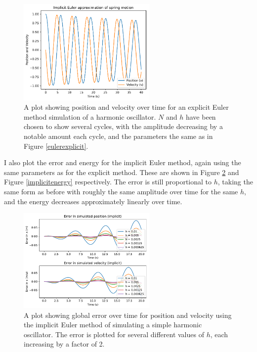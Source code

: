 \documentclass{article}
\begin{document}
\begin{figure}[H]
	\centering
	\includegraphics[width=0.6\textwidth]{eulerimplicit.pdf}
	\caption{A plot showing position and velocity over time for an explicit Euler method simulation of a harmonic oscillator. $N$ and $h$ have been chosen to show several cycles, with the amplitude decreasing by a notable amount each cycle, and the parameters the same as in Figure \ref{eulerexplicit}.}
	\label{eulerimplicit}
\end{figure}

I also plot the error and energy for the implicit Euler method, again using the same parameters as for the explicit method. These are shown in Figure \ref{impliciterror} and Figure \ref{implicitenergy} respectively. The error is still proportional to $h$, taking the same form as before with roughly the same amplitude over time for the same $h$, and the energy decreases approximately linearly over time.

\begin{figure}[H]
	\centering
	\includegraphics[width=0.6\textwidth]{eulerimpliciterror.pdf}
	\caption{A plot showing global error over time for position and velocity using the implicit Euler method of simulating a simple harmonic oscillator. The error is plotted for several different values of $h$, each increasing by a factor of 2.}
	\label{impliciterror}
\end{figure}
\end{document}
